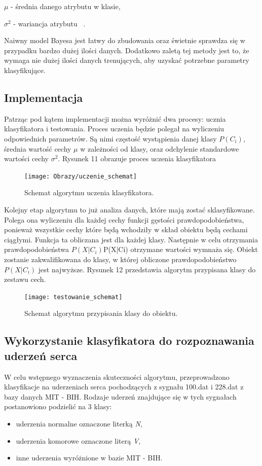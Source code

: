 \documentclass[[10pt,a4paper]{article}
\begin{document}
$\mu$ - średnia danego atrybutu w klasie,

$\sigma^{2}$ - wariancja atrybutu ~\cite{aa}.	

\vspace{0.5cm}
Naiwny model Bayesa jest łatwy do zbudowania oraz świetnie sprawdza się w przypadku bardzo dużej ilości danych. Dodatkowo zaletą tej metody jest to, że wymaga nie dużej ilości danych trenujących, aby uzyskać potrzebne parametry klasyfikujące.
\subsection{Implementacja}
Patrząc pod kątem implementacji można wyróżnić dwa procesy: ucznia klasyfikatora i testowania. 
Proces uczenia będzie polegał na wyliczeniu odpowiednich parametrów. Są nimi częstość wystąpienia danej klasy $P(C_{i})$, średnia wartość cechy $\mu$ w zależności od klasy, oraz odchylenie standardowe wartości cechy $\sigma^{2}$. Rysunek 11 obrazuje proces uczenia klasyfikatora
\begin{figure}[h]
\centering
\texttt{[image: Obrazy/uczenie\_schemat]}
\caption{Schemat algorytmu uczenia klasyfikatora.}
\label{fig:obrazek k}
\end{figure}

Kolejny etap algorytmu to już analiza danych, które mają zostać sklasyfikowane. Polega ona wyliczeniu dla każdej cechy funkcji gęstości prawdopodobieństwa, ponieważ wszystkie cechy które będą wchodziły w skład obiektu będą cechami ciągłymi. Funkcja ta obliczana jest dla każdej klasy. Następnie w celu otrzymania prawdopodobieństwa $P(X|C_{i})$P(X|Ci) otrzymane wartości wymnaża się. Obiekt zostanie zakwalifikowana do klasy, w której obliczone prawdopodobieństwo $P(X|C_{i})$ jest najwyższe.  Rysunek 12 przedstawia algorytm przypisana klasy do zestawu cech.
\begin{figure}[h]
\centering
\texttt{[image: testowanie\_schemat]}
\caption{Schemat algorytmu przypisania klasy do obiektu.}
\label{fig:obrazek k}
\end{figure}

\subsection{Wykorzystanie klasyfikatora do rozpoznawania uderzeń serca}

W celu wstępnego wyznaczenia skuteczności algorytmu, przeprowadzono klasyfikacje na uderzeniach serca pochodzących z sygnału 100.dat i 228.dat z bazy danych MIT - BIH. Rodzaje uderzeń znajdujące się w tych sygnałach postanowiono podzielić na 3 klasy: 
\begin{itemize}
\item uderzenia normalne oznaczone literką \textit{N},
\item uderzenia komorowe oznaczone literą \textit{V},
\item inne uderzenia wyróżnione w bazie MIT - BIH.
\end{itemize}
\end{document}
